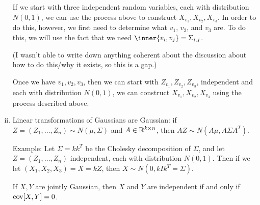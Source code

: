 \documentclass[../../../Master/AppliedStochastics.tex]{subfiles}
\begin{document}
\begin{enumerate}[(i)]
    
    If we start with three independent random variables,
        each with distribution $N(0, 1)$,
        we can use the process above to construct $X_{v_1}, X_{v_2}, X_{v_3}$.
    In order to do this, however,
        we first need to determine what $v_1$, $v_2$, and $v_3$ are.
    To do this,
        we will use the fact that we need $\inner{v_i, v_j} = \Sigma_{i,j}$.
    
    
    (I wasn't able to write down anything coherent about the discussion
        about how to do this/why it exists, so this is a gap.)
    
    
    Once we have $v_1, v_2, v_3$,
        then we can start with $Z_{v_1}, Z_{v_2}, Z_{v_3}$,
        independent and each with distribution $N(0, 1)$,
        we can construct $X_{v_1}, X_{v_2}, X_{v_3}$
        using the process described above.


    \item
    Linear transformations of Gaussians are Gaussian:
        if $Z = (Z_1, \dots, Z_n) \sim N(\mu, \Sigma)$
            and $A \in \mathbb{R}^{k \times n}$, then $A Z \sim N(A \mu, A \Sigma A^T)$.
    
    Example:
        Let $\Sigma= k k^T$ be the Cholesky decomposition of $\Sigma$,
            and let $Z = (Z_1, \dots, Z_n)$ independent,
            each with distribution $N(0, 1)$.
    Then if we let $(X_1, X_2, X_3) = X = k Z$,
        then $X \sim N(0, k I k^T = \Sigma)$.
    
    If $X, Y$ are jointly Gaussian,
        then $X$ and $Y$ are independent if and only if $\operatorname{cov}[X, Y] = 0$.
\end{enumerate}


%
\end{document}
